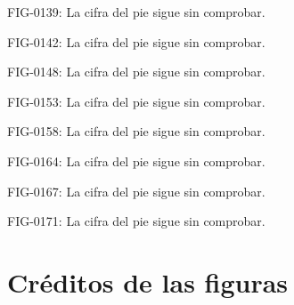 \documentclass{book}
\begin{document}
\noindent FIG-0139: La cifra del pie sigue sin comprobar.

\noindent FIG-0142: La cifra del pie sigue sin comprobar.

\noindent FIG-0148: La cifra del pie sigue sin comprobar.

\noindent FIG-0153: La cifra del pie sigue sin comprobar.

\noindent FIG-0158: La cifra del pie sigue sin comprobar.

\noindent FIG-0164: La cifra del pie sigue sin comprobar.

\noindent FIG-0167: La cifra del pie sigue sin comprobar.

\noindent FIG-0171: La cifra del pie sigue sin comprobar.
\chapter*{Créditos de las figuras}
\end{document}
